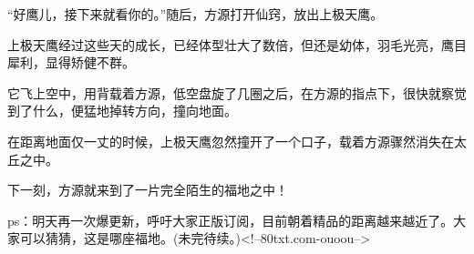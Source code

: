 \begin{this_body}
“好鹰儿，接下来就看你的。”随后，方源打开仙窍，放出上极天鹰。

上极天鹰经过这些天的成长，已经体型壮大了数倍，但还是幼体，羽毛光亮，鹰目犀利，显得矫健不群。

它飞上空中，用背载着方源，低空盘旋了几圈之后，在方源的指点下，很快就察觉到了什么，便猛地掉转方向，撞向地面。

在距离地面仅一丈的时候，上极天鹰忽然撞开了一个口子，载着方源骤然消失在太丘之中。

下一刻，方源就来到了一片完全陌生的福地之中！

ps：明天再一次爆更新，呼吁大家正版订阅，目前朝着精品的距离越来越近了。大家可以猜猜，这是哪座福地。(未完待续。)<!--80txt.com-ouoou-->

\end{this_body}

